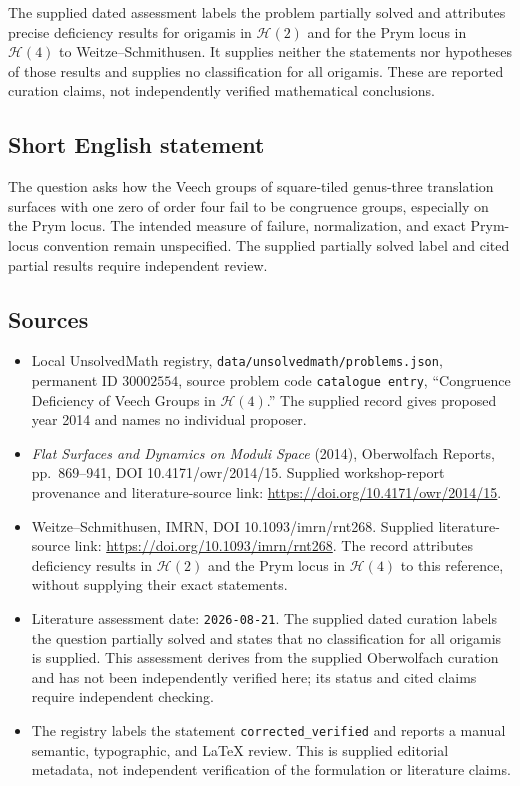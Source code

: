 \documentclass[11pt]{article}
\begin{document}
The supplied dated assessment labels the problem partially solved and attributes precise deficiency results for origamis in \(\mathcal H(2)\) and for the Prym locus in \(\mathcal H(4)\) to Weitze--Schmithusen. It supplies neither the statements nor hypotheses of those results and supplies no classification for all origamis. These are reported curation claims, not independently verified mathematical conclusions.
\subsection{Short English statement}
The question asks how the Veech groups of square-tiled genus-three translation surfaces with one zero of order four fail to be congruence groups, especially on the Prym locus. The intended measure of failure, normalization, and exact Prym-locus convention remain unspecified. The supplied partially solved label and cited partial results require independent review.
\subsection{Sources}
\begin{itemize}
\item Local UnsolvedMath registry, \texttt{data/unsolvedmath/problems.json}, permanent ID \(30002554\), source problem code \texttt{catalogue entry}, ``Congruence Deficiency of Veech Groups in \(\mathcal H(4)\).'' The supplied record gives proposed year 2014 and names no individual proposer.
\item \emph{Flat Surfaces and Dynamics on Moduli Space} (2014), Oberwolfach Reports, pp.~869--941, DOI 10.4171/owr/2014/15. Supplied workshop-report provenance and literature-source link: \url{https://doi.org/10.4171/owr/2014/15}.
\item Weitze--Schmithusen, IMRN, DOI 10.1093/imrn/rnt268. Supplied literature-source link: \url{https://doi.org/10.1093/imrn/rnt268}. The record attributes deficiency results in \(\mathcal H(2)\) and the Prym locus in \(\mathcal H(4)\) to this reference, without supplying their exact statements.
\item Literature assessment date: \texttt{2026-08-21}. The supplied dated curation labels the question partially solved and states that no classification for all origamis is supplied. This assessment derives from the supplied Oberwolfach curation and has not been independently verified here; its status and cited claims require independent checking.
\item The registry labels the statement \texttt{corrected\_verified} and reports a manual semantic, typographic, and LaTeX review. This is supplied editorial metadata, not independent verification of the formulation or literature claims.
\end{itemize}
\end{document}
